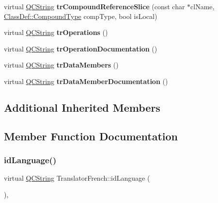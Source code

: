 \begin{DoxyCompactItemize}
\item 
\mbox{\label{class_translator_french_ac937505caf5621b0f2d4872eed990e59}} 
virtual \mbox{\hyperlink{class_q_c_string}{Q\+C\+String}} {\bfseries tr\+Compound\+Reference\+Slice} (const char $\ast$cl\+Name, \mbox{\hyperlink{class_class_def_ae70cf86d35fe954a94c566fbcfc87939}{Class\+Def\+::\+Compound\+Type}} comp\+Type, bool is\+Local)
\item 
\mbox{\label{class_translator_french_a37d37446e8c387c0458eed3c1dbd247f}} 
virtual \mbox{\hyperlink{class_q_c_string}{Q\+C\+String}} {\bfseries tr\+Operations} ()
\item 
\mbox{\label{class_translator_french_ad1d0e98cedeedad4d9304136dba9313a}} 
virtual \mbox{\hyperlink{class_q_c_string}{Q\+C\+String}} {\bfseries tr\+Operation\+Documentation} ()
\item 
\mbox{\label{class_translator_french_a9e5eeb4c9b147618f014af4196c3fc5b}} 
virtual \mbox{\hyperlink{class_q_c_string}{Q\+C\+String}} {\bfseries tr\+Data\+Members} ()
\item 
\mbox{\label{class_translator_french_af2afce834b5d85be02e2b3533c154593}} 
virtual \mbox{\hyperlink{class_q_c_string}{Q\+C\+String}} {\bfseries tr\+Data\+Member\+Documentation} ()
\end{DoxyCompactItemize}
\subsection*{Additional Inherited Members}


\subsection{Member Function Documentation}
\mbox{\label{class_translator_french_ad6c26dc602938d591898f1c670fdcf4c}} 
\subsubsection{\texorpdfstring{idLanguage()}{idLanguage()}}
{\footnotesize\ttfamily virtual \mbox{\hyperlink{class_q_c_string}{Q\+C\+String}} Translator\+French\+::id\+Language (\begin{DoxyParamCaption}{ }\end{DoxyParamCaption})\hspace{0.3cm}{\ttfamily [inline]}, {\ttfamily [virtual]}}

